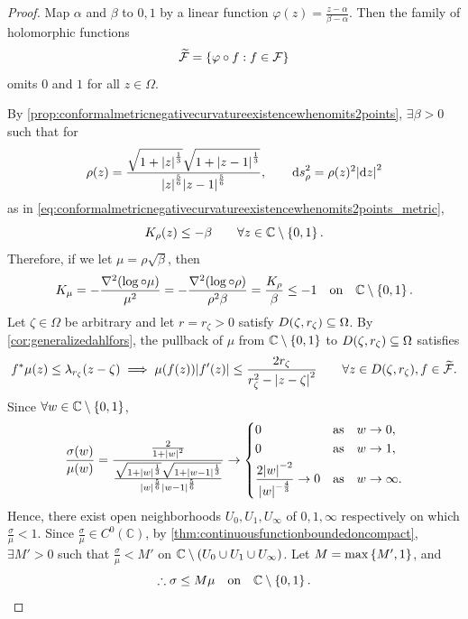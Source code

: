 \begin{proof}
    Map \(\alpha\) and \(\beta\) to \(0,1\) by a linear function \(\varphi(z)=\frac{z-\alpha}{\beta-\alpha}\). Then the family of holomorphic functions \[\widetilde{\mathcal{F}}=\cbraces{\varphi\circ f}{f\in\mathcal{F}}\] omits \(0\) and \(1\) for all \(z\in\Omega\).

    By \cref{prop:conformalmetricnegativecurvatureexistencewhenomits2points}, \(\exists\beta>0\) such that for \[\rho(z)=\frac{\sqrt{1+\abs{z}^{\frac13}}\sqrt{1+\abs{z-1}^{\frac13}}}{\abs{z}^{\frac56}\abs{z-1}^{\frac56}},\qquad\dd{s}^2_{\rho}=\rho(z)^2\abs{\dd{z}}^2\] as in \cref{eq:conformalmetricnegativecurvatureexistencewhenomits2points_metric},
    \[K_\rho(z)\leq-\beta\qquad\forall z\in\mathbb{C}\setminus\cbraces{0,1}.\]
    Therefore, if we let \(\mu=\rho\sqrt{\beta}\), then
    \begin{equation}
        K_\mu=-\frac{\laplacian(\log\circ\mu)}{\mu^2}=-\frac{\laplacian(\log\circ\rho)}{\rho^2\beta}=\frac{K_\rho}{\beta}\leq-1\qq{on}\mathbb{C}\setminus\cbraces{0,1}.\label{eq:fundamentalnormalitytest_f_mu_pullback_inequality}
    \end{equation}
    Let \(\zeta\in\Omega\) be arbitrary and let \(r=r_\zeta>0\) satisfy \(D\qty(\zeta,r_\zeta)\subseteq\Omega\). By \cref{cor:generalizedahlfors}, the pullback of \(\mu\) from \(\mathbb{C}\setminus\cbraces{0,1}\) to \(D\qty(\zeta,r_\zeta)\subseteq\Omega\) satisfies \[f^*\mu(z)\leq\lambda_{r_\zeta}(z-\zeta)\implies\mu\qty(f(z))\abs{f'(z)}\leq\frac{2r_\zeta}{r_\zeta^2-\abs{z-\zeta}^2}\qquad\forall z\in D\qty(\zeta,r_\zeta),f\in\widetilde{\mathcal{F}}.\]
    Since \(\forall w\in\mathbb{C}\setminus\cbraces{0,1}\), \[\frac{\sigma(w)}{\mu(w)}=\frac{\frac{2}{1+\abs{w}^2}}{\frac{\sqrt{1+\abs{w}^{\frac13}}\sqrt{1+\abs{w-1}^{\frac13}}}{\abs{w}^{\frac56}\abs{w-1}^{\frac56}}}\to
        \begin{dcases}
            0                                            & \qq*{as}w\to 0,     \\
            0                                            & \qq*{as}w\to 1,     \\
            \frac{2\abs{w}^{-2}}{\abs{w}^{-\frac43}}\to0 & \qq*{as}w\to\infty.
    \end{dcases}\]
    Hence, there exist open neighborhoods \(U_0,U_1,U_\infty\) of \(0,1,\infty\) respectively on which \(\frac\sigma\mu<1\). Since \(\frac{\sigma}{\mu}\in C^0(\mathbb{C})\), by \cref{thm:continuousfunctionboundedoncompact}, \(\exists M'>0\) such that \(\frac{\sigma}{\mu}<M'\) on \(\mathbb{C}\setminus\qty(U_0\cup U_1\cup U_\infty)\). Let \(M=\max\cbraces{M',1}\), and \[\therefore\sigma\leq M\mu\qq{on}\mathbb{C}\setminus\cbraces{0,1}.\]

\end{proof}
